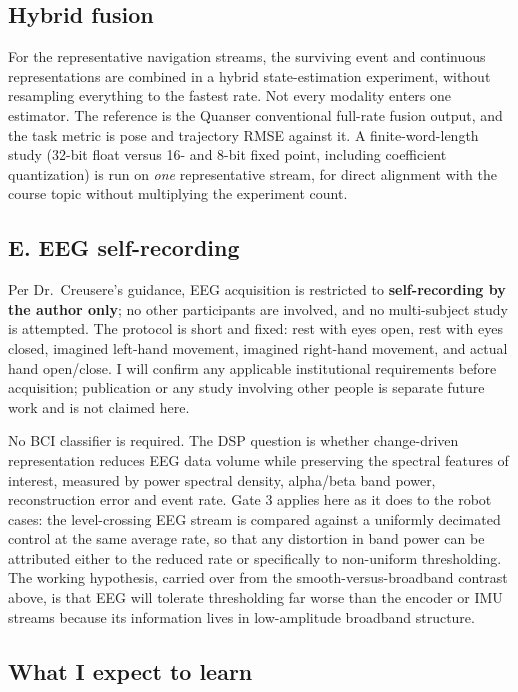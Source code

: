 \documentclass[11pt,a4paper]{article}
\begin{document}
\subsection{Hybrid fusion}

For the representative navigation streams, the surviving event and continuous
representations are combined in a hybrid state-estimation experiment, without
resampling everything to the fastest rate. Not every modality enters one estimator.
The reference is the Quanser conventional full-rate fusion output, and the task metric
is pose and trajectory RMSE against it. A
finite-word-length study (32-bit float versus 16- and 8-bit fixed point, including
coefficient quantization) is run on \emph{one} representative stream, for direct
alignment with the course topic without multiplying the experiment count.

\subsection{E. EEG self-recording}

Per Dr.~Creusere's guidance, EEG acquisition is restricted to \textbf{self-recording by
the author only}; no other participants are involved, and no multi-subject study is
attempted. The protocol is short and fixed: rest with eyes open, rest with eyes closed,
imagined left-hand movement, imagined right-hand movement, and actual hand open/close.
I will confirm any applicable institutional requirements before acquisition; publication
or any study involving other people is separate future work and is not claimed here.

No BCI classifier is required. The DSP question is whether change-driven representation
reduces EEG data volume while preserving the spectral features of interest, measured by
power spectral density, alpha/beta band power, reconstruction error and event rate.
Gate 3 applies here as it does to the robot cases: the level-crossing EEG stream is
compared against a uniformly decimated control at the same average rate, so that any
distortion in band power can be attributed either to the reduced rate or specifically
to non-uniform thresholding. The working hypothesis, carried over from the
smooth-versus-broadband contrast above, is that EEG will tolerate thresholding far
worse than the encoder or IMU streams because its information lives in low-amplitude
broadband structure.

\subsection{What I expect to learn}
\end{document}
